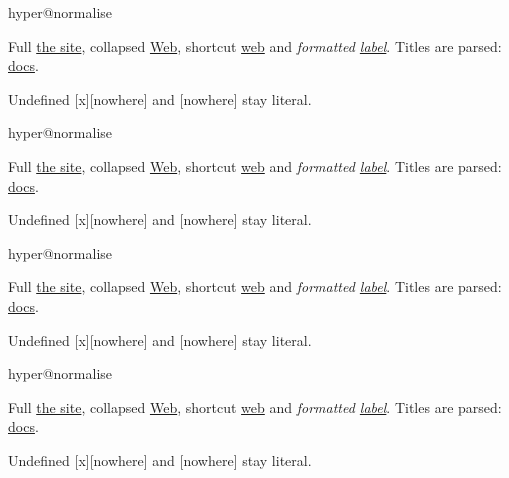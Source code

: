 \ifcsname hyper@normalise\endcsname\else\PackageError{mark2tex}{Markdown links require hyperref}{Load \string\usepackage{hyperref} in the document preamble.}\fi
Full \href{\detokenize{https://example.org/a_b?x=1&y=2}}{the site}, collapsed \href{\detokenize{https://example.org/a_b?x=1&y=2}}{Web}, shortcut \href{\detokenize{https://example.org/a_b?x=1&y=2}}{web} and \emph{formatted \href{\detokenize{https://example.org/a_b?x=1&y=2}}{label}}.
Titles are parsed: \href{\detokenize{local file.pdf}}{docs}.

Undefined [x][nowhere] and [nowhere] stay literal.

\ifcsname hyper@normalise\endcsname\else\PackageError{mark2tex}{Markdown links require hyperref}{Load \string\usepackage{hyperref} in the document preamble.}\fi
Full \href{\detokenize{https://example.org/a_b?x=1&y=2}}{the site}, collapsed \href{\detokenize{https://example.org/a_b?x=1&y=2}}{Web}, shortcut \href{\detokenize{https://example.org/a_b?x=1&y=2}}{web} and \emph{formatted \href{\detokenize{https://example.org/a_b?x=1&y=2}}{label}}.
Titles are parsed: \href{\detokenize{local file.pdf}}{docs}.

Undefined [x][nowhere] and [nowhere] stay literal.

\ifcsname hyper@normalise\endcsname\else\PackageError{mark2tex}{Markdown links require hyperref}{Load \string\usepackage{hyperref} in the document preamble.}\fi
Full \href{\detokenize{https://example.org/a_b?x=1&y=2}}{the site}, collapsed \href{\detokenize{https://example.org/a_b?x=1&y=2}}{Web}, shortcut \href{\detokenize{https://example.org/a_b?x=1&y=2}}{web} and \emph{formatted \href{\detokenize{https://example.org/a_b?x=1&y=2}}{label}}.
Titles are parsed: \href{\detokenize{local file.pdf}}{docs}.

Undefined [x][nowhere] and [nowhere] stay literal.

\ifcsname hyper@normalise\endcsname\else\PackageError{mark2tex}{Markdown links require hyperref}{Load \string\usepackage{hyperref} in the document preamble.}\fi
\begin{frame}[t]
Full \href{\detokenize{https://example.org/a_b?x=1&y=2}}{the site}, collapsed \href{\detokenize{https://example.org/a_b?x=1&y=2}}{Web}, shortcut \href{\detokenize{https://example.org/a_b?x=1&y=2}}{web} and \emph{formatted \href{\detokenize{https://example.org/a_b?x=1&y=2}}{label}}.
Titles are parsed: \href{\detokenize{local file.pdf}}{docs}.

Undefined [x][nowhere] and [nowhere] stay literal.

\end{frame}

